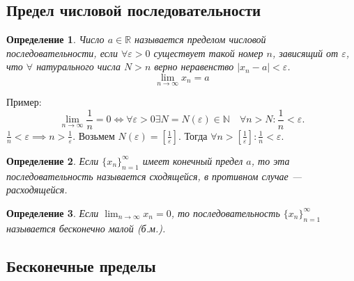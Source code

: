 \documentclass[a4paper,12pt]{article} %
\newtheorem{definition}{Определение}[section]
\theoremstyle{remark}
\theoremstyle{definition}
\begin{document}
\subsection{Предел числовой последовательности}
\begin{definition}
	Число $a\in\mathbb{R}$ называется пределом числовой последовательности, если $\forall \varepsilon>0$ существует такой номер $n$, зависящий от $\varepsilon$, что $\forall$ натурального числа $N>n$ верно неравенство $|x_n - a| < \varepsilon$.
	$$\lim_{n\to\infty} x_n = a$$
\end{definition}
\noindent Пример:
\[
\lim_{n \to \infty} \frac{1}{n} = 0 \iff \forall \varepsilon>0 \exists N=N(\varepsilon) \in \mathbb{N} \quad \forall n>N : \frac{1}{n} < \varepsilon
.\] 
$\frac{1}{n} < \varepsilon \implies n > \frac{1}{\varepsilon}$. Возьмем $N(\varepsilon) = [\frac{1}{\varepsilon}]$. Тогда $\forall n>[\frac{1}{\varepsilon}] : \frac{1}{n} < \varepsilon.$


\begin{definition}
	Если $\{x_n\}_{n=1}^{\infty}$ имеет конечный предел $a$, то эта последовательность называется сходящейся, в противном случае --- расходящейся.
\end{definition}

\begin{definition}
	Если $\lim_{n \to \infty} x_n = 0$, то последовательность $\{x_n\}_{n=1}^{\infty}$ называется бесконечно малой (б.м.).
\end{definition}
\subsection{Бесконечные пределы}
\end{document}
